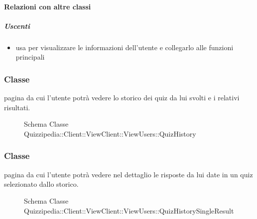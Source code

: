 \paragraph{Relazioni con altre classi}
\subparagraph{Uscenti}
\begin{itemize}
\item usa  per visualizzare le informazioni dell'utente e collegarlo alle funzioni principali
\end{itemize}
\subsubsection{Classe }
pagina da cui l'utente potrà vedere lo storico dei quiz da lui svolti e i relativi risultati.
\begin{figure}[H]
\centering
\noindent{}
\caption[Schema Classe QuizHistory]{Schema Classe Quizzipedia::Client::ViewClient::ViewUsers::QuizHistory}
\end{figure}
\subsubsection{Classe }
pagina da cui l'utente potrà vedere nel dettaglio le risposte da lui date in un quiz selezionato dallo storico.
\begin{figure}[H]
\centering
\noindent{}
\caption[Schema Classe QuizHistorySingleResult]{Schema Classe Quizzipedia::Client::ViewClient::ViewUsers::QuizHistorySingleResult}
\end{figure}
